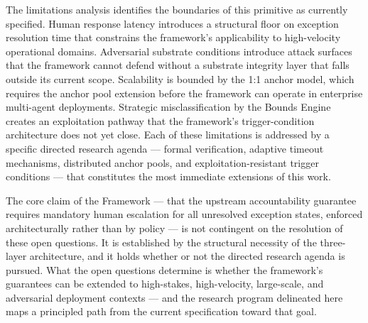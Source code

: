 The limitations analysis identifies the boundaries of this primitive as currently
specified.  Human response latency introduces a structural floor on exception
resolution time that constrains the framework's applicability to high-velocity
operational domains.  Adversarial substrate conditions introduce attack surfaces
that the framework cannot defend without a substrate integrity layer that falls
outside its current scope.  Scalability is bounded by the 1:1 anchor model, which
requires the anchor pool extension before the framework can operate in enterprise
multi-agent deployments.  Strategic misclassification by the Bounds Engine
creates an exploitation pathway that the framework's trigger-condition architecture
does not yet close.  Each of these limitations is addressed by a specific directed
research agenda --- formal verification, adaptive timeout mechanisms, distributed
anchor pools, and exploitation-resistant trigger conditions --- that constitutes
the most immediate extensions of this work.

The core claim of the \bxthree{} Framework --- that the upstream accountability
guarantee requires mandatory human escalation for all unresolved exception states,
enforced architecturally rather than by policy --- is not contingent on the
resolution of these open questions.  It is established by the structural
necessity of the three-layer architecture, and it holds whether or not the
directed research agenda is pursued.  What the open questions determine is
whether the framework's guarantees can be extended to high-stakes, high-velocity,
large-scale, and adversarial deployment contexts --- and the research program
delineated here maps a principled path from the current specification toward
that goal.
